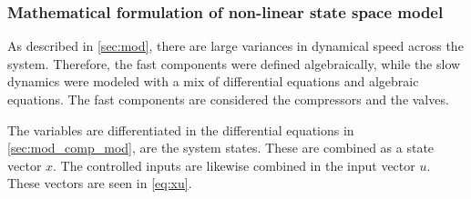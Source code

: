 \newpage

\subsubsection{Mathematical formulation of non-linear state space model} \label{sec:non_lin_model}
As described in \cref{sec:mod}, there are large variances in dynamical speed across the system. Therefore, the fast components were defined algebraically, while the slow dynamics were modeled with a mix of differential equations and algebraic equations. The fast components are considered the compressors and the valves.

The variables are differentiated in the differential equations in \cref{sec:mod_comp_mod}, are the system states. These are combined as a state vector $x$. The controlled inputs are likewise combined in the input vector $u$. These vectors are seen in \cref{eq:xu}.
